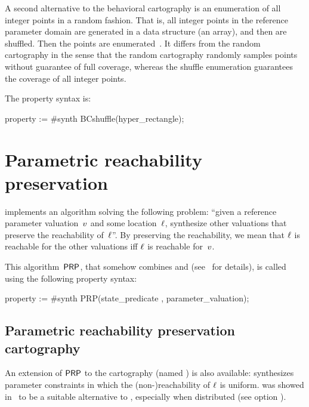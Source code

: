 A second alternative to the behavioral cartography is an enumeration of all integer points in a random fashion.
That is, all integer points in the reference parameter domain are generated in a data structure (an array), and then are shuffled.
Then the points are enumerated~\cite{ACN15}.
It differs from the random cartography in the sense that the random cartography randomly samples points without guarantee of full coverage, whereas the shuffle enumeration guarantees the coverage of all integer points.

The property syntax is:

\begin{IMITATORproperty}
property := #synth BCshuffle(hyper_rectangle);
\end{IMITATORproperty}



\section{Parametric reachability preservation}\label{ss:mode:PRP}

\imitator{} implements an algorithm solving the following problem:
``given a reference parameter valuation~$v$ and some location~$\ell$, synthesize other valuations that preserve the reachability of~$\ell$''.
By preserving the reachability, we mean that $\ell$ is reachable for the other valuations iff $\ell$ is reachable for~$v$.

This algorithm~$\mathsf{PRP}$, that somehow combines \EFsynth{} and \IM{} (see~\cite{ALNS15} for details), is called using the following property syntax:

\begin{IMITATORproperty}
property := #synth PRP(state_predicate , parameter_valuation);
\end{IMITATORproperty}



\subsection*{Parametric reachability preservation cartography}\label{sss:mode:PRPC}

An extension of $\mathsf{PRP}$ to the cartography (named \PRPC{}) is also available: \PRPC{} synthesizes parameter constraints in which the (non-)reachability of $\ell$ is uniform.
\PRPC{} was showed in~\cite{ALNS15} to be a suitable alternative to \EFsynth{}, especially when distributed (see option ).


